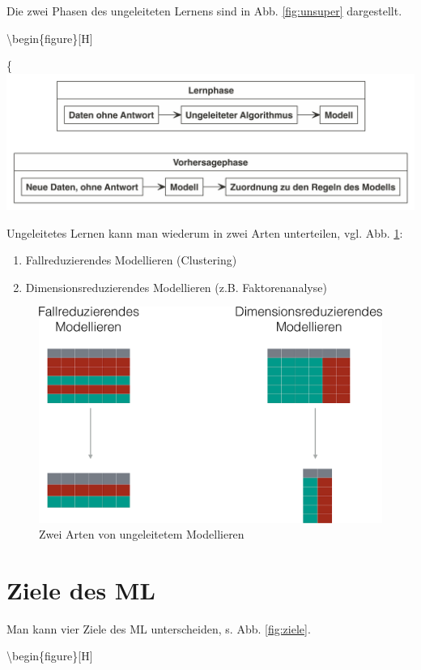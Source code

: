 \documentclass[
]{book}
\providecommand{\tightlist}{%
  \setlength{\itemsep}{0pt}\setlength{\parskip}{0pt}}
\begin{document}
Die zwei Phasen des ungeleiteten Lernens sind in Abb. \ref{fig:unsuper} dargestellt.

\textbackslash begin\{figure\}{[}H{]}

\{\centering \includegraphics[width=0.7\linewidth]{chunk-img/unsuper-1}

Ungeleitetes Lernen kann man wiederum in zwei Arten unterteilen, vgl. Abb. \ref{fig:ungel}:

\begin{enumerate}
\def\labelenumi{\arabic{enumi}.}
\tightlist
\item
  Fallreduzierendes Modellieren (Clustering)
\item
  Dimensionsreduzierendes Modellieren (z.B. Faktorenanalyse)
\end{enumerate}

\begin{figure}[H]

{\centering \includegraphics[width=0.7\linewidth]{img/ungeleitetes_Modellieren_crop} 

}

\caption{Zwei Arten von ungeleitetem Modellieren}\label{fig:ungel}
\end{figure}

\hypertarget{ziele-des-ml}{%
\section{Ziele des ML}\label{ziele-des-ml}}

Man kann vier Ziele des ML unterscheiden, s. Abb. \ref{fig:ziele}.

\textbackslash begin\{figure\}{[}H{]}
\end{document}
